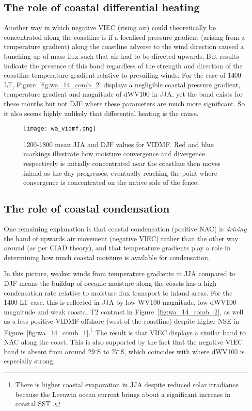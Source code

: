 \subsection{The role of coastal differential heating}

Another way in which negative \ac{VIEC} (rising air) could theoretically be concentrated along the coastline is if a localised pressure gradient (arising from a temperature gradient) along the coastline adverse to the wind direction caused a bunching up of mass flux such that air had to be directed upwards. But results indicate the presence of this band regardless of the strength and direction of the coastline temperature gradient relative to prevailing winds. For the case of 1400 \ac{LT}, Figure~\ref{fig:wa_14_comb_2} displays a negligible coastal pressure gradient, temperature gradient and magnitude of \ac{dWV100} in \ac{JJA}, yet the band exists for these months but not \ac{DJF} where these parameters are much more significant. So it also seems highly unlikely that differential heating is the cause.

\begin{figure}[!htp]
	\centering
	\texttt{[image: wa\_vidmf.png]}
	\caption[1200-1800 means for VIDMF]{1200-1800 mean \acs{JJA} and \acs{DJF} values for \acs{VIDMF}. Red and blue markings illustrate how moisture convergence and divergence respectively is initially concentrated near the coastline then moves inland as the day progresses, eventually reaching the point where convergence is concentrated on the native side of the fence.}
	\label{fig:wa_vidmf}
\end{figure}

\subsection{The role of coastal condensation}
\label{ssec:coastal_cond}

One remaining explanation is that coastal condensation (positive \ac{NAC}) is \textit{driving} the band of upwards air movement (negative \ac{VIEC}) rather than the other way around (as per \ac{CIAD} theory), and that temperature gradients play a role in determining how much coastal moisture is available for condensation.

In this picture, weaker winds from temperature gradients in \ac{JJA} compared to \ac{DJF} means the buildup of oceanic moisture along the coasts has a high condensation rate relative to moisture flux transport to inland areas. For the 1400 \ac{LT} case, this is reflected in \ac{JJA} by low \ac{WV100} magnitude, low \ac{dWV100} magnitude and weak coastal \ac{T2} contrast in Figure~\ref{fig:wa_14_comb_2}, as well as a less positive \ac{VIDMF} offshore (west of the coastline) despite higher \ac{NSE} in Figure~\ref{fig:wa_14_comb_1}.\footnote{There is higher coastal evaporation in \ac{JJA} despite reduced solar irradiance because the Leeuwin ocean current brings about a significant increase in coastal \ac{SST} \citep{berthot1997}.} The result is that \ac{VIEC} displays a similar band to \ac{NAC} along the coast. This is also supported by the fact that the negative \ac{VIEC} band is absent from around 29$^\circ$S to 27$^\circ$S, which coincides with where \ac{dWV100} is especially strong.

